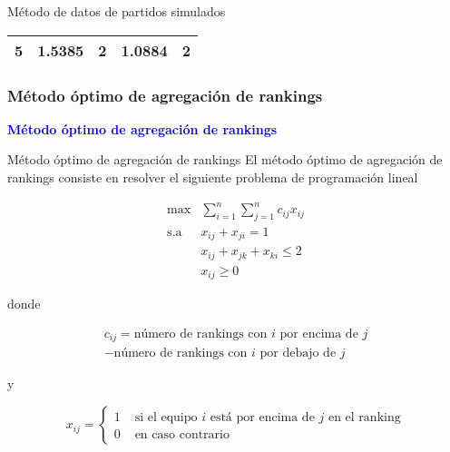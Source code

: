 \documentclass[10pt]{beamer}
\begin{document}
\begin{frame}{Método de datos de partidos simulados}
\begin{ejemplo}[continuación]
\begin{table}[h]
\begin{tabular}{@{}ccccc@{}}
				5 & 1.5385                                                           & 2                                                          & 1.0884                                                           & 2                                                          \\ \bottomrule
			\end{tabular}
		\end{table}
			
		\end{ejemplo}
	\end{frame}
	
	\subsubsection{Método óptimo de agregación de rankings}
	
	\begin{frame}
		\begin{center}
			\Huge\textbf{\textsf{\textcolor{blue}{Método óptimo de agregación de rankings}}}
		\end{center}
	\end{frame}
	
	\begin{frame}{Método óptimo de agregación de rankings}
		El método óptimo de agregación de rankings consiste en resolver el siguiente problema de programación lineal
		
		 \begin{equation}
		 \begin{array}{rl}
		 \max         & \sum\limits_{i=1}^{n} \sum\limits_{j=1}^{n} c_{ij} x_{ij}\\
		 \mathrm{s.a} & x_{ij} + x_{ji} = 1\\
		 & x_{ij} + x_{jk} + x_{ki} \leq 2\\
		 & x_{ij} \geq 0
		 \end{array}
		 \end{equation}
		 
		 donde 
		 
		 \begin{multline} \label{eq:conformidad}
		 c_{ij} = \text{número de rankings con $i$ por encima de $j$} \\ - \text{número de rankings con $i$ por debajo de $j$}
		 \end{multline}
		 
		 y
		 
		 \begin{equation}
		 x_{ij} = \begin{cases}
		 1 & \text{ si el equipo $i$ está por encima de $j$ en el ranking}\\
		 0 & \text{ en caso contrario}
		 \end{cases}
		 \end{equation}
	\end{frame}
	
\end{document}
